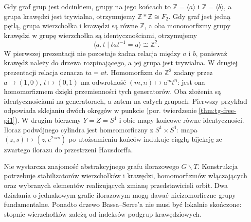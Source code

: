 \begin{przyklad}
Gdy graf grup jest odcinkiem, grupy na jego końcach to
$\mathbb Z=\langle a\rangle$ i
$\mathbb Z=\langle b\rangle$, a grupa krawędzi jest
trywialna, otrzymujemy $\mathbb Z*\mathbb Z\cong F_2$.
Gdy graf jest jedną pętlą, grupa wierzchołka i krawędzi
są równe $\mathbb Z$, a oba monomorfizmy grupy krawędzi
w grupę wierzchołka są identycznościami, otrzymujemy
\[
\langle a,t\mid tat^{-1}=a\rangle\cong\mathbb Z^2.
\]
W pierwszej prezentacji nie pozostaje żadna relacja
między $a$ i $b$, ponieważ krawędź należy do drzewa
rozpinającego, a jej grupa jest trywialna.
W drugiej prezentacji relacja oznacza $ta=at$.
Homomorfizm do $\mathbb Z^2$ zadany przez
$a\mapsto(1,0)$, $t\mapsto(0,1)$ ma odwrotność
$(m,n)\mapsto a^m t^n$: jest ona homomorfizmem
dzięki przemienności tych generatorów.
Oba złożenia są identycznościami na generatorach,
a zatem na całych grupach.
Pierwszy przykład odpowiada sklejaniu dwóch okręgów
w punkcie (por. twierdzenie \ref{thm:tg-free-pi1}).
W drugim bierzemy $Y=Z=S^1$ i obie mapy końcowe
równe identyczności. Iloraz podwójnego cylindra
jest homeomorficzny z $S^1\times S^1$:
mapa $(z,s)\mapsto(z,e^{2\pi is})$ po utożsamieniu
końców indukuje ciągłą bijekcję ze zwartego
ilorazu do przestrzeni Hausdorffa.
\end{przyklad}

\begin{center}
\end{center}

\begin{uwaga}
Nie wystarcza znajomość abstrakcyjnego grafu ilorazowego
$G\backslash T$. Konstrukcja potrzebuje stabilizatorów
wierzchołków i krawędzi, homomorfizmów włączających oraz
wybranych elementów realizujących zmianę przedstawicieli orbit.
Dwa działania o jednakowym grafie ilorazowym mogą dawać
nieizomorficzne grupy fundamentalne.
Ponadto drzewo Bassa--Serre'a nie musi być lokalnie skończone:
stopnie wierzchołków zależą od indeksów podgrup krawędziowych.
\end{uwaga}

